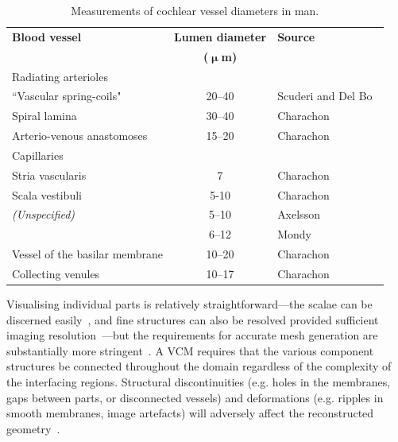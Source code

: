 \begin{table}
	\centering
	\sffamily
	\small
	
	\caption[Measurements of cochlear vessel diameters in man]{Measurements of
	cochlear vessel diameters in man.}
	\label{table:vessel_diams}
	
	\begin{tabular}{l c l}
		\toprule
		\textbf{Blood vessel} 	& \textbf{Lumen diameter}				& \textbf{Source}\\
								& \textbf{($ \boldsymbol{\upmu} $m)}	& \\
		\midrule
		
		Radiating arterioles & & \\
		\tableindent``Vascular spring-coils"	& 20--40	& Scuderi and Del Bo~\cite{scuderi1952}\\
		\tableindent Spiral lamina				& 30--40	& Charachon~\cite{charachon1961}\\
		
		Arterio-venous anastomoses				& 15--20	& Charachon~\cite{charachon1961}\\
		
		Capillaries & & \\
		\tableindent Stria vascularis			& 7			& Charachon~\cite{charachon1961}\\
		\tableindent Scala vestibuli			& 5-10		& Charachon~\cite{charachon1961}\\
		\tableindent \textit{(Unspecified)}		& 5--10		& Axelsson~\cite{axelsson1968}\\
		\tableindent 							& 6--12		& Mondy~\cite{mondy2009thesis}\\
		
		Vessel of the basilar membrane			& 10--20	& Charachon~\cite{charachon1961}\\
		Collecting venules						& 10--17	& Charachon~\cite{charachon1961}\\
		\bottomrule
	\end{tabular}
\end{table}

Visualising individual parts is relatively straightforward---the scalae can be
discerned easily~\cite{poznyakovskiy2008,potratz2010}, and fine structures can
also be resolved provided sufficient imaging resolution~\cite{braun2012}---but
the requirements for accurate mesh generation are substantially more
stringent~\cite{poznyakovskiy2008}. A VCM requires that the various component
structures be connected throughout the domain regardless of the complexity of
the interfacing regions. Structural discontinuities (e.g. holes in the
membranes, gaps between parts, or disconnected vessels) and deformations (e.g.
ripples in smooth membranes, image artefacts) will adversely affect the
reconstructed geometry~\cite{briaire2000mesh,poznyakovskiy2008,johnson2014}.

